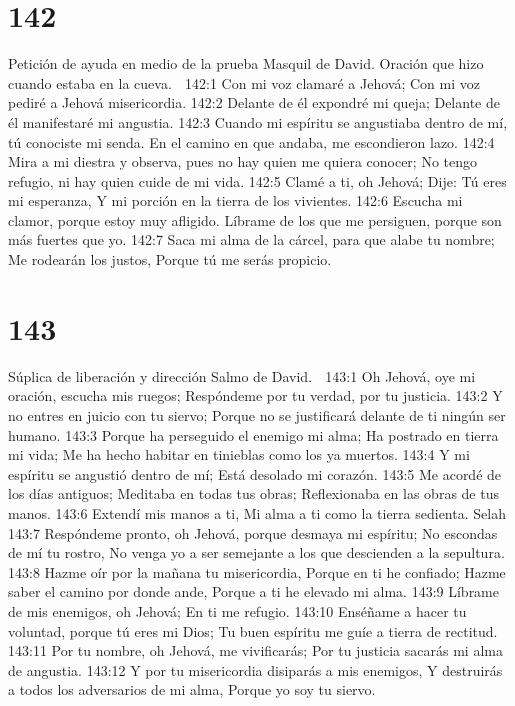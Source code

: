 \chapter{142}

Petición de ayuda en medio de la prueba 
Masquil de David. Oración que hizo cuando estaba en la cueva. 

142:1 Con mi voz clamaré a Jehová; 
Con mi voz pediré a Jehová misericordia. 
142:2 Delante de él expondré mi queja; 
Delante de él manifestaré mi angustia. 
142:3 Cuando mi espíritu se angustiaba dentro de mí, tú conociste mi senda. 
En el camino en que andaba, me escondieron lazo. 
142:4 Mira a mi diestra y observa, pues no hay quien me quiera conocer; 
No tengo refugio, ni hay quien cuide de mi vida. 
142:5 Clamé a ti, oh Jehová; 
Dije: Tú eres mi esperanza, 
Y mi porción en la tierra de los vivientes. 
142:6 Escucha mi clamor, porque estoy muy afligido. 
Líbrame de los que me persiguen, porque son más fuertes que yo. 
142:7 Saca mi alma de la cárcel, para que alabe tu nombre; 
Me rodearán los justos, 
Porque tú me serás propicio. 

\chapter{143}

Súplica de liberación y dirección 
Salmo de David. 

143:1 Oh Jehová, oye mi oración, escucha mis ruegos; 
Respóndeme por tu verdad, por tu justicia. 
143:2 Y no entres en juicio con tu siervo; 
Porque no se justificará delante de ti ningún ser humano. 
143:3 Porque ha perseguido el enemigo mi alma; 
Ha postrado en tierra mi vida; 
Me ha hecho habitar en tinieblas como los ya muertos. 
143:4 Y mi espíritu se angustió dentro de mí; 
Está desolado mi corazón. 
143:5 Me acordé de los días antiguos; 
Meditaba en todas tus obras; 
Reflexionaba en las obras de tus manos. 
143:6 Extendí mis manos a ti, 
Mi alma a ti como la tierra sedienta. Selah 
143:7 Respóndeme pronto, oh Jehová, porque desmaya mi espíritu; 
No escondas de mí tu rostro, 
No venga yo a ser semejante a los que descienden a la sepultura. 
143:8 Hazme oír por la mañana tu misericordia, 
Porque en ti he confiado; 
Hazme saber el camino por donde ande, 
Porque a ti he elevado mi alma. 
143:9 Líbrame de mis enemigos, oh Jehová; 
En ti me refugio. 
143:10 Enséñame a hacer tu voluntad, porque tú eres mi Dios; 
Tu buen espíritu me guíe a tierra de rectitud. 
143:11 Por tu nombre, oh Jehová, me vivificarás; 
Por tu justicia sacarás mi alma de angustia. 
143:12 Y por tu misericordia disiparás a mis enemigos, 
Y destruirás a todos los adversarios de mi alma, 
Porque yo soy tu siervo. 

